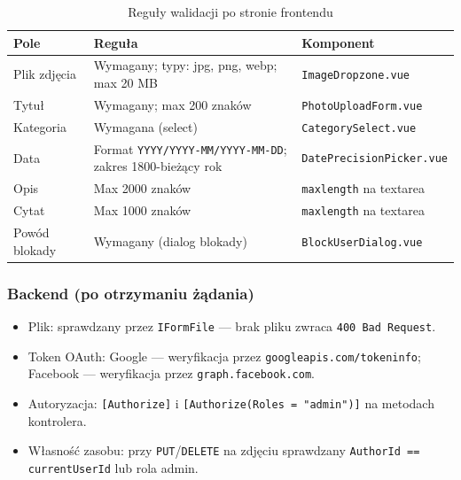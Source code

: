 \documentclass[12pt, a4paper]{article}
\begin{document}
\begin{table}[H]
  \centering
  \caption{Reguły walidacji po stronie frontendu}
  \begin{tabular}{@{}L{3cm}L{6cm}L{5cm}@{}}
    \toprule
    \textbf{Pole} & \textbf{Reguła} & \textbf{Komponent} \\
    \midrule
    Plik zdjęcia   & Wymagany; typy: jpg, png, webp; max 20 MB        & \texttt{ImageDropzone.vue} \\
    \addlinespace
    Tytuł          & Wymagany; max 200 znaków                          & \texttt{PhotoUploadForm.vue} \\
    \addlinespace
    Kategoria      & Wymagana (select)                                 & \texttt{CategorySelect.vue} \\
    \addlinespace
    Data           & Format \texttt{YYYY/YYYY-MM/YYYY-MM-DD}; zakres 1800-bieżący rok & \texttt{DatePrecisionPicker.vue} \\
    \addlinespace
    Opis           & Max 2000 znaków                                   & \texttt{maxlength} na textarea \\
    \addlinespace
    Cytat          & Max 1000 znaków                                   & \texttt{maxlength} na textarea \\
    \addlinespace
    Powód blokady  & Wymagany (dialog blokady)                         & \texttt{BlockUserDialog.vue} \\
    \bottomrule
  \end{tabular}
\end{table}

\subsubsection{Backend (po otrzymaniu żądania)}

\begin{itemize}
  \item Plik: sprawdzany przez \texttt{IFormFile} --- brak pliku zwraca \texttt{400 Bad Request}.
  \item Token OAuth: Google --- weryfikacja przez \texttt{googleapis.com/tokeninfo};
        Facebook --- weryfikacja przez \texttt{graph.facebook.com}.
  \item Autoryzacja: \texttt{[Authorize]} i \texttt{[Authorize(Roles = "admin")]}
        na metodach kontrolera.
  \item Własność zasobu: przy \texttt{PUT}/\texttt{DELETE} na zdjęciu sprawdzany
        \texttt{AuthorId == currentUserId} lub rola admin.
\end{itemize}
\end{document}
